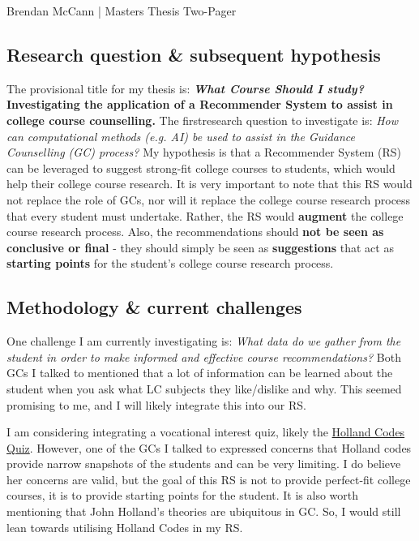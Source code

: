 \documentclass{article}  %
\begin{document}
	
	\begin{center}
		\begin{Large}
			Brendan McCann | Masters Thesis Two-Pager
		\end{Large}
	\end{center}
	
    \subsection*{Research question \& subsequent hypothesis}

    The provisional title for my thesis is: \textbf{\emph{What Course Should I study?} Investigating the application of a Recommender System to assist in college course counselling.}
    The firstresearch question to investigate is: \emph{How can computational methods (e.g. AI) be used to assist in the Guidance Counselling (GC) process?}
    My hypothesis is that a Recommender System (RS) can be leveraged to suggest strong-fit college courses to students, 
    which would help their college course research.
    It is very important to note that this RS would not replace the role of GCs, nor will it replace the college course research process that every student must undertake.
    Rather, the RS would \textbf{augment} the college course research process.
    Also, the recommendations should \textbf{not be seen as conclusive or final} - they should simply be seen as \textbf{suggestions} that act as 
    \textbf{starting points} for the student's college course research process.

    \subsection*{Methodology \& current challenges}

    One challenge I am currently investigating is:
    \emph{What data do we gather from the student in order to make informed and effective course recommendations?}
    Both GCs I talked to mentioned that a lot of information can be learned about the student when you ask what LC subjects they like/dislike and why.
    This seemed promising to me, and I will likely integrate this into our RS.

    I am considering integrating a vocational interest quiz, likely the \href{https://openpsychometrics.org/tests/RIASEC/}{Holland Codes Quiz}. 
    However, one of the GCs I talked to expressed concerns that Holland codes provide narrow snapshots of the students and can be very limiting.
    I do believe her concerns are valid, but the goal of this RS is not to provide perfect-fit college courses, 
    it is to provide starting points for the student.
    It is also worth mentioning that John Holland's theories are ubiquitous in GC.
    So, I would still lean towards utilising Holland Codes in my RS.
    
\end{document}
